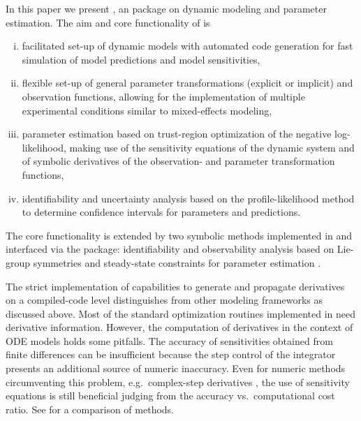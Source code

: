 \documentclass[article]{jss}
\begin{document}
In this paper we present , an  package on dynamic modeling and parameter estimation. The aim and core functionality of  is
\begin{enumerate}[(i)]
	\item facilitated set-up of dynamic models with automated  code generation for fast simulation of model predictions and model sensitivities,
	\item flexible set-up of general parameter transformations (explicit or implicit) and observation functions, allowing for the implementation of multiple experimental conditions similar to mixed-effects modeling,
	\item parameter estimation based on trust-region optimization of the negative log-likelihood, making use of the sensitivity equations of the dynamic system and of symbolic derivatives of the observation- and parameter transformation functions,
	\item identifiability and uncertainty analysis based on the profile-likelihood method to determine confidence intervals for parameters and predictions.
\end{enumerate}

The core functionality is extended by two symbolic methods implemented in  and interfaced via the  package: identifiability and observability analysis based on Lie-group symmetries \citep{merkt2015higher} and steady-state constraints for parameter estimation \citep{rosenblatt2016customized}.

The strict implementation of capabilities to generate and propagate derivatives on a compiled-code level distinguishes  from other modeling frameworks as discussed above. Most of the standard optimization routines implemented in  need derivative information. However, the computation of derivatives in the context of ODE models holds some pitfalls. The accuracy of sensitivities obtained from finite differences can be insufficient because the step control of the integrator presents an additional source of numeric inaccuracy. Even for numeric methods circumventing this problem, e.g.~complex-step derivatives \citep{squire1998using}, the use of sensitivity equations is still beneficial judging from the accuracy vs.~computational cost ratio. See \citep{raue2013lessons} for a comparison of methods.
\end{document}
